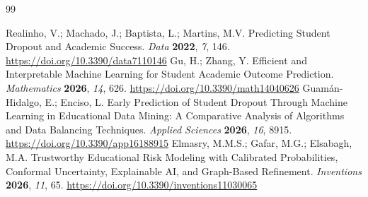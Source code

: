 \begin{thebibliography}{99}
\setlength{\itemsep}{2pt}

Realinho, V.; Machado, J.; Baptista, L.; Martins, M.V.
Predicting Student Dropout and Academic Success.
\emph{Data} \textbf{2022}, \emph{7}, 146.
\url{https://doi.org/10.3390/data7110146}
Gu, H.; Zhang, Y.
Efficient and Interpretable Machine Learning for Student Academic Outcome
Prediction.
\emph{Mathematics} \textbf{2026}, \emph{14}, 626.
\url{https://doi.org/10.3390/math14040626}
Guam\'an-Hidalgo, E.; Enciso, L.
Early Prediction of Student Dropout Through Machine Learning in Educational
Data Mining: A Comparative Analysis of Algorithms and Data Balancing
Techniques.
\emph{Applied Sciences} \textbf{2026}, \emph{16}, 8915.
\url{https://doi.org/10.3390/app16188915}
Elmasry, M.M.S.; Gafar, M.G.; Elsabagh, M.A.
Trustworthy Educational Risk Modeling with Calibrated Probabilities, Conformal
Uncertainty, Explainable AI, and Graph-Based Refinement.
\emph{Inventions} \textbf{2026}, \emph{11}, 65.
\url{https://doi.org/10.3390/inventions11030065}


\end{thebibliography}
